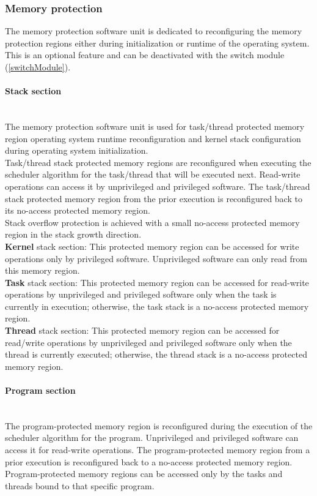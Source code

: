 \subsubsection{Memory protection}

The memory protection software unit is dedicated to reconfiguring the memory protection regions either during initialization or runtime of the operating system. This is an optional feature and can be deactivated with the switch module (\ref{switchModule}).

\paragraph{Stack section}\mbox{}\\
\indent The memory protection software unit is used for task/thread protected memory region operating system runtime reconfiguration and kernel stack configuration during operating system initialization.\\
\indent Task/thread stack protected memory regions are reconfigured when executing the scheduler algorithm for the task/thread that will be executed next.  Read-write operations can access it by unprivileged and privileged software.  The task/thread stack protected memory region from the prior execution is reconfigured back to its no-access protected memory region.\\
\indent Stack overflow protection is achieved with a small no-access protected memory region in the stack growth direction.\\

\textbf{Kernel} stack section: This protected memory region can be accessed for write operations only by privileged software. Unprivileged software can only read from this memory region.\\

\textbf{Task} stack section: This protected memory region can be accessed for read-write operations by unprivileged and privileged software only when the task is currently in execution; otherwise, the task stack is a no-access protected memory region.\\

\textbf{Thread} stack section: This protected memory region can be accessed for read/write operations by unprivileged and privileged software only when the thread is currently executed; otherwise, the thread stack is a no-access protected memory region.

\paragraph{Program section}\mbox{}\\
\indent The program-protected memory region is reconfigured during the execution of the scheduler algorithm for the program. Unprivileged and privileged software can access it for read-write operations. The program-protected memory region from a prior execution is reconfigured back to a no-access protected memory region. Program-protected memory regions can be accessed only by the tasks and threads bound to that specific program.\\

